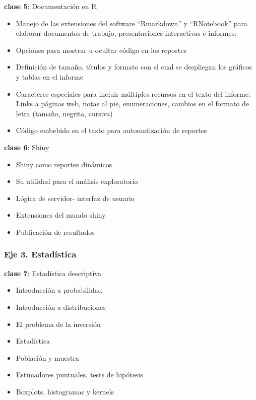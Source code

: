\documentclass[]{book}
\providecommand{\tightlist}{%
  \setlength{\itemsep}{0pt}\setlength{\parskip}{0pt}}
\begin{document}
\textbf{clase 5}: Documentación en R

\begin{itemize}
\tightlist
\item
  Manejo de las extensiones del software ``Rmarkdown'' y ``RNotebook'' para elaborar documentos de trabajo, presentaciones interactivas e informes:
\item
  Opciones para mostrar u ocultar código en los reportes
\item
  Definición de tamaño, títulos y formato con el cual se despliegan los gráficos y tablas en el informe
\item
  Caracteres especiales para incluir múltiples recursos en el texto del informe: Links a páginas web, notas al pie, enumeraciones, cambios en el formato de letra (tamaño, negrita, cursiva)
\item
  Código embebido en el texto para automatización de reportes
\end{itemize}

\textbf{clase 6}: Shiny

\begin{itemize}
\tightlist
\item
  Shiny como reportes dinámicos
\item
  Su utilidad para el análisis exploratorio
\item
  Lógica de servidor- interfaz de usuario
\item
  Extensiones del mundo shiny
\item
  Publicación de resultados
\end{itemize}

\hypertarget{eje-3.-estadistica}{%
\subsubsection*{\texorpdfstring{\textbf{Eje 3. Estadística}}{Eje 3. Estadística}}\label{eje-3.-estadistica}}

\textbf{clase 7}: Estadística descriptiva

\begin{itemize}
\tightlist
\item
  Introducción a probabilidad
\item
  Introducción a distribuciones
\item
  El problema de la inversión
\item
  Estadística
\item
  Población y muestra
\item
  Estimadores puntuales, tests de hipótesis
\item
  Boxplots, histogramas y kernels
\end{itemize}
\end{document}

